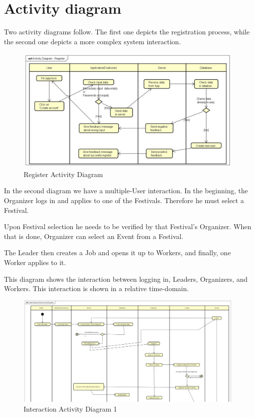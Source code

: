 		\section{Activity diagram}
		
		Two activity diagrams follow. The first one depicts the registration process, while the second one depicts a more complex system interaction.

		\begin{figure}[H]
			\includegraphics[width=\linewidth]{diagrams/Activity Diagram - Register.png}
			\caption{Register Activity Diagram}
			\label{fig:register_activity_diag}
		\end{figure}

		In the second diagram we have a multiple-User interaction. In the beginning, the Organizer logs in and applies to one of the Festivals. Therefore he must select a Festival.
		
		Upon Festival selection he needs to be verified by that Festival's Organizer. When that is done, Organizer can select an Event from a Festival.
		
		The Leader then creates a Job and opens it up to Workers, and finally, one Worker applies to it.
		
		This diagram shows the interaction between logging in, Leaders, Organizers, and Workers. This interaction is shown in a relative time-domain.
		
		\begin{figure}[H]
			\includegraphics[width=\linewidth]{diagrams/Interaction_Activity_Diag_1.png}
			\caption{Interaction Activity Diagram 1}
			\label{fig:interaction_activity_diag_1}
		\end{figure}
	
